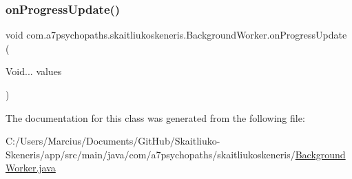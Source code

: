 \mbox{\label{classcom_1_1a7psychopaths_1_1skaitliukoskeneris_1_1_background_worker_a598c4211054a8aee7a61b1e13c652b00}} 
\subsubsection{\texorpdfstring{on\+Progress\+Update()}{onProgressUpdate()}}
{\footnotesize\ttfamily void com.\+a7psychopaths.\+skaitliukoskeneris.\+Background\+Worker.\+on\+Progress\+Update (\begin{DoxyParamCaption}\item[{Void...}]{values }\end{DoxyParamCaption})\hspace{0.3cm}{\ttfamily [protected]}}



The documentation for this class was generated from the following file\+:\begin{DoxyCompactItemize}
\item 
C\+:/\+Users/\+Marcius/\+Documents/\+Git\+Hub/\+Skaitliuko-\/\+Skeneris/app/src/main/java/com/a7psychopaths/skaitliukoskeneris/\mbox{\hyperlink{_background_worker_8java}{Background\+Worker.\+java}}\end{DoxyCompactItemize}
